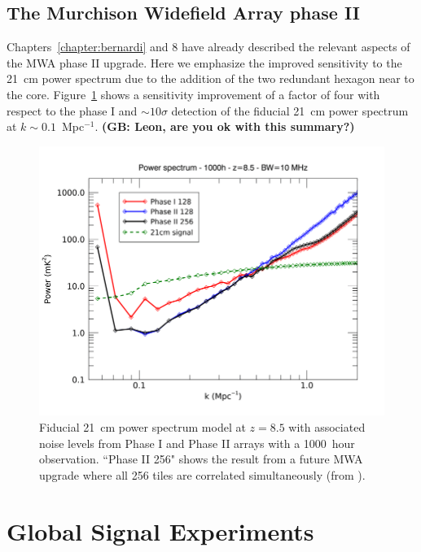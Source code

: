 \subsection{The Murchison Widefield Array phase II}

Chapters~\ref{chapter:bernardi} and 8 have already described the relevant aspects of the MWA phase II upgrade. Here we emphasize the improved sensitivity to the 21~cm power spectrum due to the addition of the two redundant hexagon near to the core. Figure~\ref{fig:fig_mwa_phaseII_pspec} shows a sensitivity improvement of a factor of four with respect to the phase I and $\sim 10\sigma$ detection of the fiducial 21~cm power spectrum at $k \sim 0.1$~Mpc$^{-1}$. {\bf (GB: Leon, are you ok with this summary?)}
\begin{figure}[]
\begin{center}
\includegraphics[width=1.\textwidth]{Koopmans_Bernardi/mwa_phaseII_pspec}
\end{center}
\caption{Fiducial 21~cm power spectrum model at $z = 8.5$ with associated noise levels from Phase I and Phase II arrays with a 1000~hour observation. ``Phase II 256" shows the result from a future MWA upgrade where all 256 tiles are correlated simultaneously (from \cite{wayth18}).}
\label{fig:fig_mwa_phaseII_pspec}
\end{figure}




\section{Global Signal Experiments}

